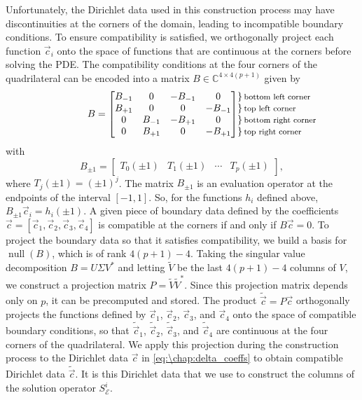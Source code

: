 Unfortunately, the Dirichlet data used in this construction process may have discontinuities at the corners of the domain, leading to incompatible boundary conditions. To ensure compatibility is satisfied, we orthogonally project each function $\vec{c}_i$ onto the space of functions that are continuous at the corners before solving the PDE. The compatibility conditions at the four corners of the quadrilateral can be encoded into a matrix $B \in \mathbb{C}^{4 \times 4(p+1)}$ given by
\[
\hspace{1.6cm}
B = \begin{bmatrix}
B_{-1} & 0 & -B_{-1} & 0 \\
B_{+1} & 0 & 0 & -B_{-1} \\
0 & B_{-1} & -B_{+1} & 0 \\
0 & B_{+1} & 0 & -B_{+1}
\end{bmatrix}%
\!\!\!\!
\begin{array}{l}
\}\,\text{\footnotesize bottom left corner} \\
\}\,\text{\footnotesize top left corner} \\
\}\,\text{\footnotesize bottom right corner} \\
\}\,\text{\footnotesize top right corner}
\end{array}
\]
with
\[
B_{\pm 1} =
\begin{bmatrix}
T_0(\pm1) & T_1(\pm1) & \cdots & T_p(\pm1)
\end{bmatrix},
\]
where $T_j(\pm1) = (\pm1)^j$. The matrix $B_{\pm 1}$ is an evaluation operator at the endpoints of the interval $[-1, 1]$. So, for the functions $h_i$ defined above, $B_{\pm 1} \vec{c}_i = h_i(\pm 1)$. A given piece of boundary data defined by the coefficients $\vec{c} = [\vec{c}_1, \vec{c}_2, \vec{c}_3, \vec{c}_4]$ is compatible at the corners if and only if $B\vec{c} = 0$. To project the boundary data so that it satisfies compatibility, we build a basis for $\operatorname{null}(B)$, which is of rank $4(p+1)-4$. Taking the singular value decomposition $B = U\Sigma V^*$ and letting $\tilde{V}$ be the last $4(p+1)-4$ columns of $V$, we construct a projection matrix $P = \tilde{V} \tilde{V}^*$. Since this projection matrix depends only on $p$, it can be precomputed and stored. The product $\tilde{\vec{c}} = P\vec{c}$ orthogonally projects the functions defined by $\vec{c}_1$, $\vec{c}_2$, $\vec{c}_3$, and $\vec{c}_4$ onto the space of compatible boundary conditions, so that $\tilde{\vec{c}}_1$, $\tilde{\vec{c}}_2$, $\tilde{\vec{c}}_3$, and $\tilde{\vec{c}}_4$ are continuous at the four corners of the quadrilateral. We apply this projection during the construction process to the Dirichlet data $\vec{c}$ in \cref{eq:\chap:delta_coeffs} to obtain compatible Dirichlet data $\tilde{\vec{c}}$. It is this Dirichlet data that we use to construct the columns of the solution operator $S_{\mathcal{E}}^i$.

